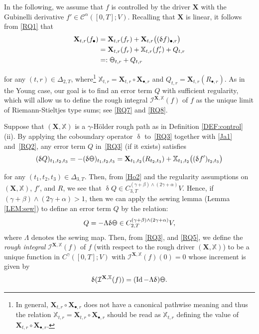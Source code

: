 \documentclass[letterpaper, 11pt,  reqno]{amsart}
\DeclareMathOperator{\Id}{Id}
\newcommand{\1}{\hspace{0.5mm}\textup{I}\hspace{0.5mm}}
\newcommand{\I}{\mathcal{I}}
\newcommand{\noi}{\noindent}
\newcommand{\bul}{\bullet}
\newcommand{\CC}{\mathcal{C}}
\newcommand{\al}{\alpha}
\newcommand{\be}{\beta}
\newcommand{\updl}{\updelta}
\newcommand{\Dl}{\Delta}
\newcommand{\g}{\gamma}
\newcommand{\Ld}{\Lambda}
\newcommand{\XXb}{\mathbb{X}}
\newcommand{\XX}{\mathbf{X}}
\def\doublestroke#1{\pdfliteral{1 Tr .35 w}#1\pdfliteral{0 Tr 0 w}}
\newcommand{\Taa}{\doublestroke{\Theta}}
\numberwithin{equation}{section}
\numberwithin{theorem}{section}
\begin{document}
In the following, 
 we assume that $f$ is controlled by the driver $\XX$
with the Gubinelli derivative 
$f'\in \CC^{\al}([0,T];V)$.
 Recalling  that $\XX$ is linear, 
 it follows
from \eqref{RQ1} that 
\begin{align}
\begin{split}
\XX_{t, r}(f_\bul)
& = \XX_{t, r}(f_r) + 
 \XX_{t, r}\big((\updl f)_{\bul, r}\big)\\
& = \XX_{t, r}(f_r) +  \XXb_{t, r} (f_r') 
+ Q_{t, r} \\
& =:\Taa_{t, r} + Q_{t, r}
\end{split}
\label{RQ3}
\end{align}

\noi
for any $(t, r) \in\Dl_{2, T}$, 
where\footnote{In general,  
$\XX_{t, r}\circ \XX_{\bul, r}$ does not have a canonical pathwise
meaning and thus
the relation $\XXb_{t, r} = \XX_{t, r}\circ \XX_{\bul, r}$
should be read as 
$\XXb_{t, r}$ defining the value of  $\XX_{t, r}\circ \XX_{\bul, r}$.}
$\XXb_{t, r} = \XX_{t, r}\circ \XX_{\bul, r}$
and 
$Q_{t, r} = \XX_{t, r}(R_{\bul, r})$.
As in the Young case, 
our goal is to find an error term $Q$ with sufficient regularity, 
which will allow us to define the rough integral
 $\I^{\XX,  \XXb}(f)$ of $f$
  as the unique limit of 
Riemann-Stieltjes type sums; see \eqref{RQ7} and \eqref{RQ8}.



Suppose that $(\XX, \XXb)$ is 
a $\g$-H\"older rough path
as in Definition \ref{DEF:control}\,(ii).
By applying the coboundary operator $\updl$
to~\eqref{RQ3}
together with \eqref{Ja1} and~\eqref{RQ2}, 
any error term $Q$ in~\eqref{RQ3} (if it exists) satisfies
\begin{align}
(\updl Q)_{t_1, t_2, t_3}
= - (\updl  \Taa)_{t_1, t_2, t_3}
  = \XX_{t_1,t_2} (R_{t_2,t_3}) + \XXb_{t_1,t_2}\big( (\updl f')_{t_2,t_3}\big)
\label{RQ4}
\end{align}

\noi
for any $(t_1, t_2, t_3) \in\Dl_{3, T}$.
Then, from \eqref{Ho2} and the regularity assumptions on $(\XX, \XXb)$, 
$f'$, and $R$, 
we see that 
$\updl Q
 \in C^{(\g + \be)\wedge (2\g + \al)}_{3,T}V$.
Hence, if $(\g + \be)\wedge (2\g + \al) > 1$, 
then we can apply the sewing lemma (Lemma \ref{LEM:sew})
to define an error term $Q$ by the relation:
\begin{align}
Q = - \Ld \updl  \Taa
\in C^{(\g + \be)\wedge (2\g + \al)}_{2,T}V,
\label{RQ5} 
\end{align}
where $\Ld$ denotes the sewing map.
Then, 
from 
 \eqref{RQ3},  
and \eqref{RQ5}, 
we  define 
the {\it rough integral} $\I^{\XX, \XXb}(f)$ of $f$
(with respect to the rough driver $(\XX, \XXb)$)
to be  a unique function 
in $ C^\g([0,T]; V)$
with $\I^{\XX, \XXb}(f)(0) = 0$
whose increment is given by 
\begin{align}
\updl (\I^{\XX, \XXb}(f))
= (\Id - \Ld \updl )\Taa.
\label{RQ6}
\end{align}
\end{document}

